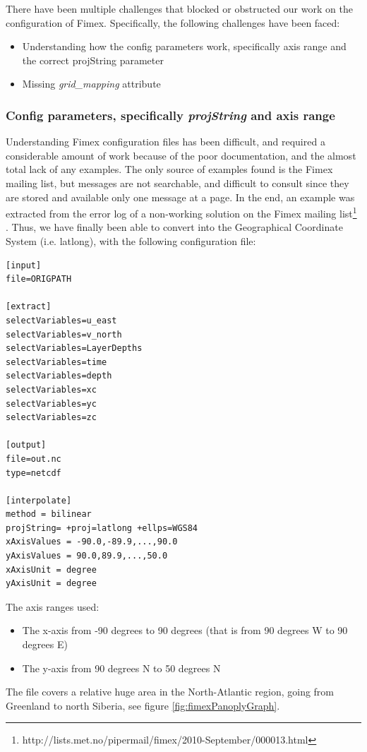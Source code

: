 \documentclass[11pt,a4paper,titlepage,oneside]{report}
\begin{document}
There have been multiple challenges that blocked or obstructed our work on the configuration of Fimex. Specifically, the following challenges have been faced:
\begin{itemize}
\item Understanding how the config parameters work, specifically axis range and the correct projString parameter
\item Missing \textit{grid\_mapping} attribute
\end{itemize}
\subsubsection{Config parameters, specifically \textit{projString} and axis range}
Understanding Fimex configuration files has been difficult, and required a considerable amount of work because of the poor documentation, and the almost total lack of any examples.
The only source of examples found is the Fimex mailing list, but messages are not searchable, and difficult to consult since they are stored and available only one message at a page.
In the end, an example was extracted from the error log of a non-working solution on the Fimex mailing list\footnote{http://lists.met.no/pipermail/fimex/2010-September/000013.html} .
Thus, we have finally been able to convert into the Geographical Coordinate System (i.e. latlong), with the following configuration file:
\begin{lstlisting}
[input]
file=ORIGPATH

[extract]
selectVariables=u_east
selectVariables=v_north
selectVariables=LayerDepths
selectVariables=time
selectVariables=depth
selectVariables=xc
selectVariables=yc
selectVariables=zc

[output]
file=out.nc
type=netcdf

[interpolate]
method = bilinear
projString= +proj=latlong +ellps=WGS84
xAxisValues = -90.0,-89.9,...,90.0
yAxisValues = 90.0,89.9,...,50.0
xAxisUnit = degree
yAxisUnit = degree

\end{lstlisting}

The axis ranges used:
\begin{itemize}
\item The x-axis from -90 degrees to 90 degrees (that is from 90 degrees W to 90 degrees E)
\item The y-axis from 90 degrees N to 50 degrees N
\end{itemize}

The file covers a relative huge area in the North-Atlantic region, going from Greenland to north Siberia, see figure \ref{fig:fimexPanoplyGraph}.
\end{document}

